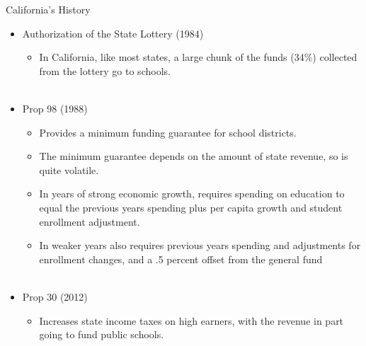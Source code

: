\documentclass{beamer}
\begin{document}
\begin{frame}[<+->]{California's History}
	\begin{itemize}
		\item Authorization of the State Lottery (1984)
		\begin{itemize}
			\item In California, like most states, a large chunk of the funds (34\%) collected from the lottery go to schools. \\~\\
		\end{itemize} 
		\item Prop 98 (1988)
		\begin{itemize}
			\item Provides a minimum funding guarantee for school districts. 
			\item The minimum guarantee depends on the amount of state revenue, so is quite volatile.
			\item In years of strong economic growth, requires spending on education to equal the previous years spending plus per capita growth and student enrollment adjustment. 
			\item In weaker years also requires previous years spending and adjustments for enrollment changes, and a .5 percent offset from the general fund \\~\\
		\end{itemize}
		\item Prop 30 (2012)
		\begin{itemize}
			\item Increases state income taxes on high earners, with the revenue in part going to fund public schools.
		\end{itemize}
	\end{itemize}
\end{frame}
\end{document}

